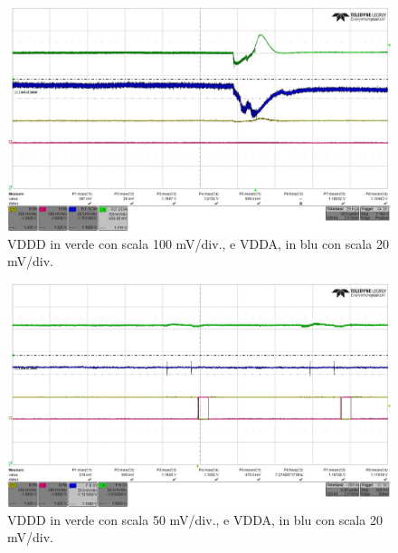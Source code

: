 \begin{figure}
\centering
\includegraphics[scale=.3]{Immagini/alllin1}
\caption{VDDD in verde con scala 100 mV/div., e VDDA, in blu con scala 20 mV/div.}
\label{alllin1}
\end{figure}
\begin{figure}
\centering
\includegraphics[scale=.3]{Immagini/alllin2}
\caption{VDDD in verde con scala 50 mV/div., e VDDA, in blu con scala 20 mV/div.}
\label{alllin2}
\end{figure}

